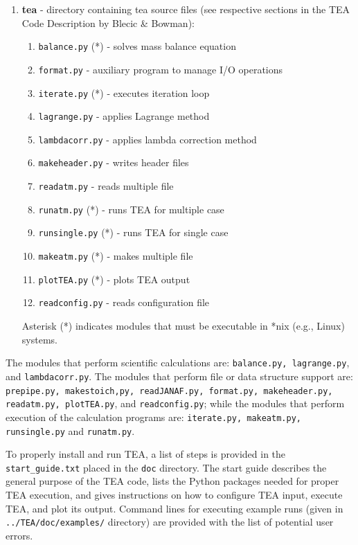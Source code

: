 {\begin{enumerate}
Asterisk (*) indicates modules that must be executable in *nix (e.g.,
Linux) systems.

\item {\bf tea } - directory containing tea source files (see  
respective sections in the TEA Code Description by Blecic \& Bowman):
\begin{enumerate}
\setlength\itemsep{0ex}
\setlength\topsep{0ex}
\setlength\partopsep{0ex}
\setlength\parsep{0ex}
\item \texttt{balance.py} (*) - solves mass balance equation
\item \texttt{format.py} - auxiliary program to manage I/O operations
\item \texttt{iterate.py} (*) - executes iteration loop 
\item \texttt{lagrange.py} - applies Lagrange method
\item \texttt{lambdacorr.py} - applies lambda correction method
\item \texttt{makeheader.py} - writes header files
\item \texttt{readatm.py} - reads multiple  file
\item \texttt{runatm.py} (*) - runs TEA for multiple  case
\item \texttt{runsingle.py} (*) - runs TEA for single  case
\item \texttt{makeatm.py} (*) - makes multiple  file
\item \texttt{plotTEA.py} (*) - plots TEA output
\item \texttt{readconfig.py} - reads configuration file
\end{enumerate}

Asterisk (*) indicates modules that must be executable in *nix (e.g.,
Linux) systems.

\end{enumerate}

The modules that perform scientific calculations are:
\texttt{balance.py, lagrange.py}, and \texttt{lambdacorr.py}. The
modules that perform file or data structure support are:
\texttt{prepipe.py, makestoich,py, readJANAF.py, format.py,
  makeheader.py, readatm.py, plotTEA.py}, and \texttt{readconfig.py};
while the modules that perform execution of the calculation programs
are: \texttt{iterate.py, makeatm.py, runsingle.py} and
\texttt{runatm.py}.

To properly install and run TEA, a list of steps is provided in the
\texttt{start\_guide.txt} placed in the \texttt{doc} directory. The start
guide describes the general purpose of the TEA code, lists the Python
packages needed for proper TEA execution, and gives instructions on
how to configure TEA input, execute TEA, and plot its output. Command
lines for executing example runs (given
in \texttt{../TEA/doc/examples/} directory) are provided with the list
of potential user errors.

}
